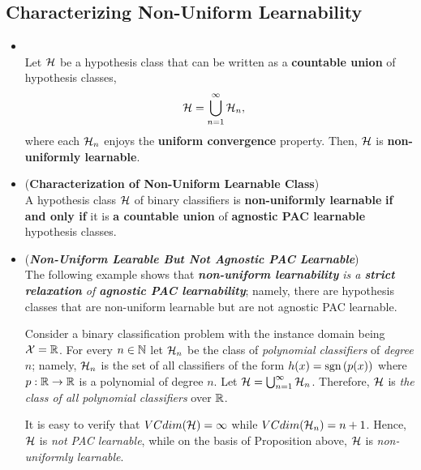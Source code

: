 \documentclass[11pt]{article}
\begin{document}
\subsection{Characterizing Non-Uniform Learnability}
\begin{itemize}
\item \begin{lemma} \citep{shalev2014understanding}\\
Let ${\mathcal H}$ be a hypothesis class that can be written as a \textbf{countable union} of hypothesis classes, 
\begin{align*}
{\mathcal H} &= \bigcup_{n = 1}^{\infty}{\mathcal H}_n,
\end{align*}
where each ${\mathcal H}_n$ enjoys the \textbf{uniform convergence} property. Then, ${\mathcal H}$ is \textbf{non-uniformly learnable}.
\end{lemma}

\item \begin{proposition} (\textbf{Characterization of Non-Uniform Learnable Class}) \citep{shalev2014understanding}\\
A hypothesis class ${\mathcal H}$ of binary classifiers is \textbf{non-uniformly learnable} \textbf{if and only if} it is \textbf{a countable union} of \textbf{agnostic PAC learnable} hypothesis classes.
\end{proposition}


\item \begin{example} (\textbf{\emph{Non-Uniform Learable But Not Agnostic PAC Learnable}})\\
The following example shows that \emph{\textbf{non-uniform learnability} is a \textbf{strict relaxation} of \textbf{agnostic PAC learnability}}; namely, there are hypothesis classes that are non-uniform learnable but are not agnostic PAC learnable.

Consider a binary classification problem with the instance domain being ${\mathcal X} = {\mathbb R}$. For every $n \in {\mathbb N}$ let ${\mathcal H}_n$ be the class of \emph{polynomial classifiers} of \emph{degree $n$}; namely, ${\mathcal H}_n$ is the set of all classifiers of the form $h(x) = \text{sgn}\left(p(x)\right)$ where $p: {\mathbb R} \to {\mathbb R}$ is a polynomial of degree $n$. Let ${\mathcal H} = \bigcup_{n = 1}^{\infty}{\mathcal H}_n$. Therefore, ${\mathcal H}$ is \emph{the class of all polynomial classifiers} over ${\mathbb R}$. 

It is easy to verify that $VCdim({\mathcal H}) = \infty$ while $VCdim({\mathcal H}_n) = n + 1$. Hence, ${\mathcal H}$ is \emph{not PAC learnable}, while on the basis of Proposition above, ${\mathcal H}$ is \emph{non-uniformly learnable}.
\end{example}
\end{itemize}
\end{document}

